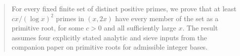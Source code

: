 \begin{abstract}
For every fixed finite set of distinct positive primes, we prove that
at least $cx/(\log x)^2$ primes in $(x,2x)$ have every member of the set
as a primitive root, for some $c>0$ and all sufficiently large $x$.
The result assumes four explicitly stated analytic and sieve inputs
from the companion paper on primitive roots for admissible integer bases.
\end{abstract}
